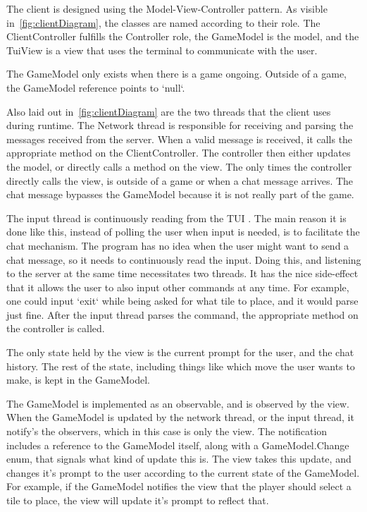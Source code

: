 \documentclass[12pt, letterpaper]{article}
\begin{document}
    The client is designed using the Model-View-Controller pattern.
    As visible in~\autoref{fig:clientDiagram}, the classes are named according to their role.
    The ClientController fulfills the Controller role, the GameModel is the model,
    and the TuiView is a view that uses the terminal to communicate with the user.

    The GameModel only exists when there is a game ongoing.
    Outside of a game, the GameModel reference points to `null`.

    Also laid out in~\autoref{fig:clientDiagram} are the two threads that the client uses during runtime.
    The Network thread is responsible for receiving and parsing the messages received from the server.
    When a valid message is received, it calls the appropriate method on the ClientController.
    The controller then either updates the model, or directly calls a method on the view.
    The only times the controller directly calls the view, is outside of a game or when a chat message arrives.
    The chat message bypasses the GameModel because it is not really part of the game.

    The input thread is continuously reading from the TUI .
    The main reason it is done like this, instead of polling the user when input is needed, is to facilitate the chat
    mechanism.
    The program has no idea when the user might want to send a chat message, so it needs to continuously read the input.
    Doing this, and listening to the server at the same time necessitates two threads.
    It has the nice side-effect that it allows the user to also input other commands at any time.
    For example, one could input `exit` while being asked for what tile to place, and it would parse just fine.
    After the input thread parses the command, the appropriate method on the controller is called.

    The only state held by the view is the current prompt for the user, and the chat history.
    The rest of the state, including things like which move the user wants to make, is kept in the GameModel.

    The GameModel is implemented as an observable, and is observed by the view.
    When the GameModel is updated by the network thread, or the input thread, it notify's the observers, which in this
    case is only the view.
    The notification includes a reference to the GameModel itself, along with a GameModel.Change enum, that signals
    what kind of update this is.
    The view takes this update, and changes it's prompt to the user according to the current state of the GameModel.
    For example, if the GameModel notifies the view that the player should select a tile to place, the view will
    update it's prompt to reflect that.
\end{document}
